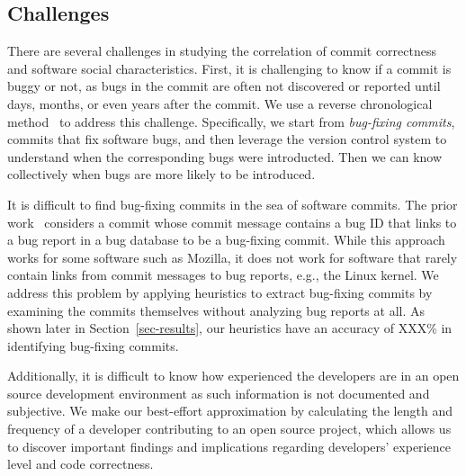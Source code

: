\subsection{Challenges}
There are several challenges in studying the correlation of commit correctness and software social characteristics.
First, it is challenging to know if a commit is buggy or not,
as bugs in the commit are often not 
discovered or reported until days, months, or even years after the commit. 
We use a reverse chronological method~\cite{sliwerski-msr-2005} to address this challenge. 
Specifically, we start from {\em bug-fixing commits}, commits that fix software bugs, 
and then leverage the version control system to understand when the corresponding bugs were introducted. 
Then we can know collectively when bugs are more likely to be introduced. 

It is difficult to find bug-fixing commits in the sea of software commits.
The prior work~\cite{sliwerski-msr-2005} considers a commit whose commit message contains a bug 
ID that links to a bug report in a bug database to be a bug-fixing commit. While this
approach works for some software such as Mozilla, it does not work for software that 
rarely contain links from commit messages to bug reports, e.g., the Linux kernel.
We address this problem by applying heuristics to extract bug-fixing commits by examining
the commits themselves without analyzing bug reports at all. As shown later in Section~\ref{sec-results}, 
our heuristics have an accuracy of XXX\% in identifying bug-fixing commits.

Additionally, it is difficult to know how experienced the developers are in an open source development
environment as such information is not documented and subjective. 
We make our best-effort approximation by calculating the length and frequency of a developer
contributing to an open source project, which allows us to discover important findings 
and implications regarding developers' experience level and code correctness. 

